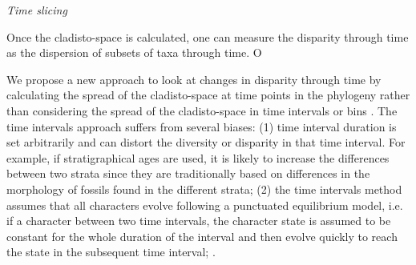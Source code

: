 \documentclass[12pt,letterpaper]{article}
\renewcommand{\subsection}[1]{%
\bigskip
\begin{center}
\begin{large}
\normalfont\itshape #1
\end{large}
\end{center}}
\begin{document}

\subsection{Time slicing} %
Once the cladisto-space is calculated, one can measure the disparity through time as the dispersion of subsets of taxa through time. O

We propose a new approach to look at changes in disparity
through time by calculating the spread of the cladisto-space at time points in the phylogeny rather than considering the spread of the cladisto-space in time intervals or bins \citep[e.g.][]{Brusatte12092008,brusattedinosaur2012,toljagictriassic-jurassic2013}. The time intervals approach suffers from several biases: (1) time interval duration is set arbitrarily and can distort the diversity or disparity in that time interval. For example, if stratigraphical ages are used, it is likely to increase the differences between two strata since they are traditionally based on differences in the morphology of fossils found in the different strata; (2) the time intervals method assumes that all characters evolve following a punctuated equilibrium model, i.e. if a character 
between two time intervals, the character state is assumed to be constant for the whole duration of the interval and then evolve quickly to reach the state in the subsequent time interval; \citep{Gould1977}. %
\end{document}
